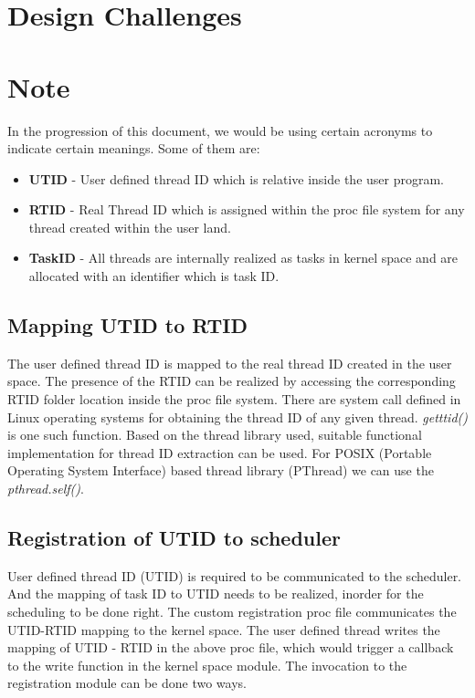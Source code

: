 
\section{Design Challenges}


\section*{Note}
In the progression of this document, we would be using certain acronyms to indicate certain meanings. 
Some of them are:
\begin{itemize}
\item \textbf{UTID} - User defined thread ID which is relative inside the user program. 
\item \textbf{RTID} - Real Thread ID which is assigned within the proc file system for any thread created within the user land. 
\item \textbf{TaskID} - All threads are internally realized as tasks in kernel space and are allocated with an identifier which is task ID.
\end{itemize}

\subsection{Mapping UTID to RTID}

The user defined thread ID is mapped to the real thread ID created in the user space. 
The presence of the RTID can be realized by accessing the corresponding RTID folder location inside the proc file system. 
There are system call defined in Linux operating systems for obtaining the thread ID of any given thread. 
\emph{getttid()} is one such function. 
Based on the thread library used, suitable functional implementation for thread ID extraction can be used. 
For POSIX (Portable Operating System Interface) based thread library (PThread) we can use the \emph{pthread.self()}.

\subsection{Registration of UTID to scheduler}

User defined thread ID (UTID) is required to be communicated to the scheduler. 
And the mapping of task ID to UTID needs to be realized, inorder for the scheduling to be done right. 
The custom registration proc file communicates the UTID-RTID mapping to the kernel space. 
The user defined thread writes the mapping of UTID - RTID in the above proc file, which would trigger a callback to the write function in the kernel space module. 
The invocation to the registration module can be done two ways.

